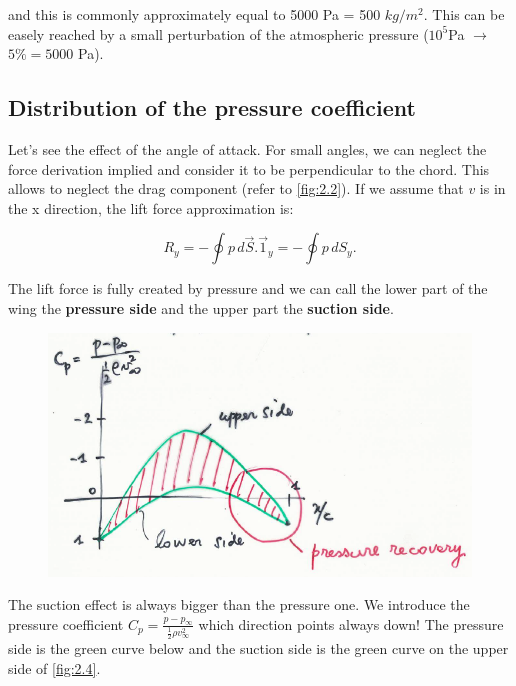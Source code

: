 		and this is commonly approximately equal to 5000 Pa = 500 $kg/m^2$. This can be easely reached by a small perturbation of the atmospheric pressure ($10^5$Pa $\rightarrow$ $5\% = 5000$ Pa). \\
		
		\subsection{Distribution of the pressure coefficient}
			Let's see the effect of the angle of attack. For small angles, we can neglect the force derivation implied and consider it to be perpendicular to the chord. This allows to neglect the drag component (refer to \autoref{fig:2.2}). If we assume that $v$ is in the x direction, the lift force approximation is:
			
			\begin{equation}
			R_y = - \oint p \, d\vec{S}.\vec{1}_y = - \oint p \, dS_y.
			\end{equation}						
			 
			The lift force is fully created by pressure and we can call the lower part of the wing the \textbf{pressure side} and the upper part the \textbf{suction side}. 
			
			\begin{figure}
			\vspace{-5mm}
			\includegraphics[scale=0.4]{ch2/4}
			\label{fig:2.4}
			\end{figure}
			The suction effect is always bigger than the pressure one. We introduce the pressure coefficient $C_p = \frac{p-p_\infty}{\frac{1}{2}\rho v_\infty ^2}$ which direction points always down! The pressure side is the green curve below and the suction side is the green curve on the upper side of \autoref{fig:2.4}. \\

